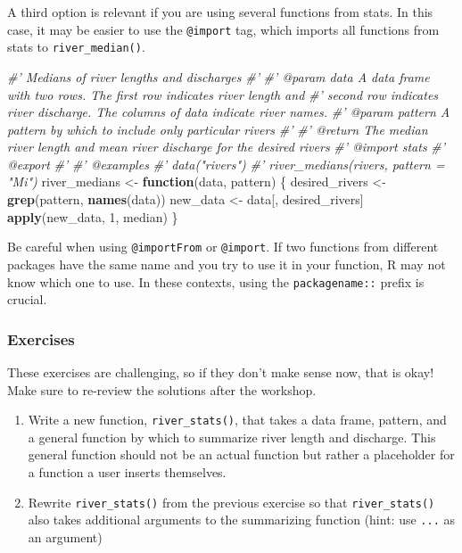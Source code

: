 \documentclass[
]{book}
\newenvironment{Shaded}{\begin{snugshade}}{\end{snugshade}}
\newcommand{\CommentTok}[1]{\textcolor[rgb]{0.56,0.35,0.01}{\textit{#1}}}
\newcommand{\ControlFlowTok}[1]{\textcolor[rgb]{0.13,0.29,0.53}{\textbf{#1}}}
\newcommand{\DecValTok}[1]{\textcolor[rgb]{0.00,0.00,0.81}{#1}}
\newcommand{\KeywordTok}[1]{\textcolor[rgb]{0.13,0.29,0.53}{\textbf{#1}}}
\newcommand{\NormalTok}[1]{#1}
\newcommand{\StringTok}[1]{\textcolor[rgb]{0.31,0.60,0.02}{#1}}
\begin{document}
A third option is relevant if you are using several functions from stats. In this case, it may be easier to use the \texttt{@import} tag, which imports all functions from stats to \texttt{river\_median()}.

\begin{Shaded}
\begin{Highlighting}[]
\CommentTok{#' Medians of river lengths and discharges}
\CommentTok{#'}
\CommentTok{#' @param data A data frame with two rows. The first row indicates river length and}
\CommentTok{#'   second row indicates river discharge. The columns of data indicate river names.}
\CommentTok{#' @param pattern A pattern by which to include only particular rivers}
\CommentTok{#'}
\CommentTok{#' @return The median river length and mean river discharge for the desired rivers}
\CommentTok{#' @import stats}
\CommentTok{#' @export}
\CommentTok{#'}
\CommentTok{#' @examples}
\CommentTok{#' data("rivers")}
\CommentTok{#' river_medians(rivers, pattern = "Mi")}
\NormalTok{river_medians <-}\StringTok{ }\ControlFlowTok{function}\NormalTok{(data, pattern) \{}
\NormalTok{  desired_rivers <-}\StringTok{ }\KeywordTok{grep}\NormalTok{(pattern, }\KeywordTok{names}\NormalTok{(data))}
\NormalTok{  new_data <-}\StringTok{ }\NormalTok{data[, desired_rivers]}
  \KeywordTok{apply}\NormalTok{(new_data, }\DecValTok{1}\NormalTok{, median)}
\NormalTok{\}}
\end{Highlighting}
\end{Shaded}

Be careful when using \texttt{@importFrom} or \texttt{@import}. If two functions from different packages have the same name and you try to use it in your function, R may not know which one to use. In these contexts, using the \texttt{packagename::} prefix is crucial.

\hypertarget{ex-set3}{%
\subsubsection{Exercises}\label{ex-set3}}

These exercises are challenging, so if they don't make sense now, that is okay! Make sure to re-review the solutions after the workshop.

\begin{enumerate}
\def\labelenumi{\arabic{enumi}.}
\item
  Write a new function, \texttt{river\_stats()}, that takes a data frame, pattern, and a general function by which to summarize river length and discharge. This general function should not be an actual function but rather a placeholder for a function a user inserts themselves.
\item
  Rewrite \texttt{river\_stats()} from the previous exercise so that \texttt{river\_stats()} also takes additional arguments to the summarizing function (hint: use \texttt{...} as an argument)
\end{enumerate}
\end{document}
